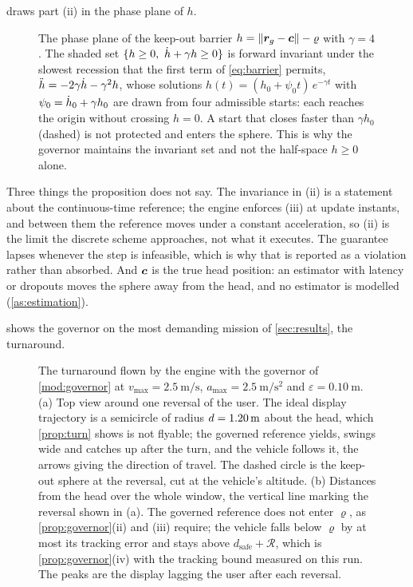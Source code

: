  draws part (ii) in the phase plane of $h$.

\begin{figure}[tbp]
\centering

\caption{The phase plane of the keep-out barrier $h=\|\bm{r}_g-\bm{c}\|-\varrho$
with $\gamma=4$. The shaded set $\{h\ge0,\ \dot{h}+\gamma h\ge0\}$ is forward
invariant under the slowest recession that the first term of
\cref{eq:barrier} permits, $\ddot{h}=-2\gamma\dot{h}-\gamma^2h$, whose solutions
$h(t)=(h_0+\psi_0t)\,e^{-\gamma t}$ with $\psi_0=\dot{h}_0+\gamma h_0$ are drawn
from four admissible starts: each reaches the origin without crossing $h=0$.
A start that closes faster than $\gamma h_0$ (dashed) is not protected and
enters the sphere. This is why the governor maintains the invariant set and
not the half-space $h\ge0$ alone.}
\label{fig:barrier}
\end{figure}

Three things the proposition does not say. The invariance in (ii) is a
statement about the continuous-time reference; the engine enforces (iii) at
update instants, and between them the reference moves under a constant
acceleration, so (ii) is the limit the discrete scheme approaches, not what it
executes. The guarantee lapses whenever the step is infeasible, which is why
that is reported as a violation rather than absorbed. And $\bm{c}$ is the
true head position: an estimator with latency or dropouts moves the sphere
away from the head, and no estimator is modelled (\cref{as:estimation}).

 shows the governor on the most demanding mission of
\cref{sec:results}, the turnaround.

\begin{figure}[tbp]
\centering

\caption{The turnaround flown by the engine with the governor of
\cref{mod:governor} at $v_{\max}=\SI{2.5}{\metre\per\second}$,
$a_{\max}=\SI{2.5}{\metre\per\second\squared}$ and
$\varepsilon=\SI{0.10}{\metre}$. (a) Top view around one reversal of the user.
The ideal display trajectory is a semicircle of radius
$d=\SI{1.20}{\metre}$ about the head, which \cref{prop:turn} shows is
not flyable; the governed reference yields, swings wide and catches up after
the turn, and the vehicle follows it, the arrows giving the direction of
travel. The dashed circle is the keep-out sphere at the reversal, cut at the
vehicle's altitude. (b) Distances from the head over the whole window, the
vertical line marking the reversal shown in (a). The governed reference does
not enter $\varrho$, as \cref{prop:governor}(ii) and (iii) require; the
vehicle falls below $\varrho$ by at most its tracking error and stays above
$d_{\mathrm{safe}}+\mathcal{R}$, which is \cref{prop:governor}(iv) with the
tracking bound measured on this run. The peaks are the display lagging the
user after each reversal.}
\label{fig:turnaround}
\end{figure}

